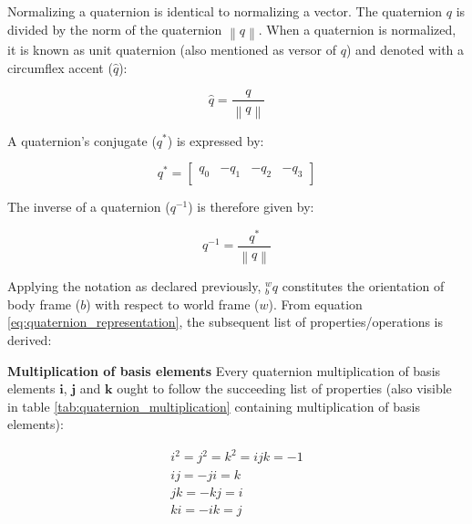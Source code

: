 Normalizing a quaternion is identical to normalizing a vector. The quaternion $q$ is divided by the norm of the quaternion $\left\lVert q \right\rVert$. When a quaternion is normalized, it is known as unit quaternion (also mentioned as versor of $q$) and denoted with a circumflex accent ($\hat{q}$):

\begin{equation}
    \hat{q} = \frac{q}{\left\lVert q \right\rVert }
\end{equation}


A quaternion's conjugate ($q^{\ast} $) is expressed by:

\begin{equation}
    q^{\ast}  =\begin{bmatrix}
        q_0 & -q_1 & -q_2 & -q_3 \\
    \end{bmatrix}
\end{equation}

The inverse of a quaternion (${q^{-1}}$) is therefore given by:

\begin{equation}
    q^{-1} = \frac{q^{\ast} }{\left\lVert q \right\rVert }
\end{equation}

Applying the notation as declared previously, ${^w_b}q$ constitutes the orientation of body frame ($b$) with respect to world frame ($w$). From equation \ref{eq:quaternion_representation}, the subsequent list of properties/operations is derived:

\item \textbf{Multiplication of basis elements} Every quaternion multiplication of basis elements $\boldsymbol{i}$, $\boldsymbol{j}$ and $\boldsymbol{k}$ ought to follow the succeeding list of properties (also visible in table \ref{tab:quaternion_multiplication} containing multiplication of basis elements):


\begin{equation}
    \begin{gathered}
        i^2=j^2=k^2=ijk=-1 \\
        ij = -ji = k       \\
        jk = -kj = i       \\
        ki = -ik = j       \\
    \end{gathered}
    \label{eq:quaternion_rules}
\end{equation}


